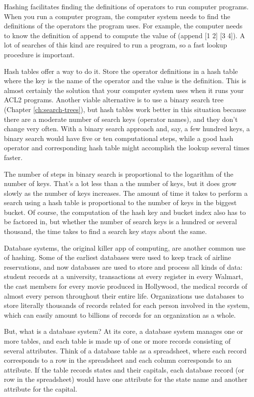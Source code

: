 Hashing facilitates finding the definitions of operators
to run computer programs. 
When you run a computer program,
the computer system needs to find the definitions 
of the operators the program uses.
For example, the computer needs to know the definition of
\textsf{append} to compute the value of \textsf{(append [1 2] [3  4])}.
A lot of searches of this kind are required to run a program,
so a fast lookup procedure is important.

Hash tables offer a way to do it. Store the operator
definitions in a hash table where the key is the name of the operator
and the value is the definition. This is almost certainly the solution
that your computer system uses when it runs your ACL2 programs.
Another viable alternative is to use a binary search tree
(Chapter \ref{ch:search-trees}), but hash tables work better
in this situation because there are a moderate number of search keys
(operator names), and they don't change very often.
With a binary search approach and, say, a few hundred keys,
a binary search would have five or ten computational steps,
while a good hash operator and corresponding hash table
might accomplish the lookup several times faster.

The number of steps in binary search is proportional to the
logarithm of the number of keys. That's a lot less than a the
number of keys, but it does grow slowly as the number of keys increases.
The amount of time it takes to perform a search using a hash table
is proportional to the number of keys in the biggest bucket.
Of course, the computation of the hash key and bucket index
also has to be factored in, but whether the number of search keys
is a hundred or several thousand, the time takes to find a search
key stays about the same.

Database systems, the original killer app of
computing, are another common use of hashing.
Some of the earliest databases were used to keep track
of airline reservations, and now databases are used to store and
process all kinds of data: student records at a university,
transactions at every register in every Walmart, the
cast members for every movie produced in Hollywood,
the medical records of almost every person throughout their entire life.
Organizations use databases to store literally
thousands of records related for each person involved in the system,
which can easily amount to billions
of records for an organization as a whole.

But, what is a database system? At its core, a database system
manages one or more tables, and each table is made up of one or more
records consisting of several attributes.
Think of a database table as a
spreadsheet, where each record corresponds to a row in the spreadsheet
and each column corresponds to an attribute. If the table
records states and their capitals, each database
record (or row in the spreadsheet) would have one attribute for the
state name and another attribute for the capital.

